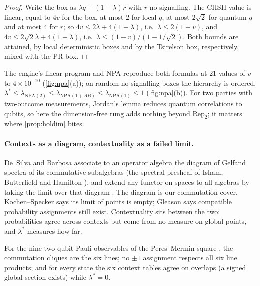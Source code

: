 \documentclass[11pt]{article}
\theoremstyle{definition}\newtheorem{definition}[theorem]{Definition}\newtheorem{remark}[theorem]{Remark}\newtheorem{example}[theorem]{Example}
\begin{document}
\begin{proof}
Write the box as $\lambda q+(1-\lambda)r$ with $r$ no-signalling. The CHSH value is linear, equal to $4v$ for the box, at most $2$ for local $q$,
at most $2\sqrt2$ for quantum $q$ and at most $4$ for $r$; so $4v\le2\lambda+4(1-\lambda)$, i.e.\ $\lambda\le2(1-v)$, and $4v\le2\sqrt2\lambda+
4(1-\lambda)$, i.e.\ $\lambda\le(1-v)/(1-1/\sqrt2)$. Both bounds are attained, by local deterministic boxes and by the Tsirelson box,
respectively, mixed with the PR box.
\end{proof}

The engine's linear program and NPA reproduce both formulas at $21$ values of $v$ to $4\times10^{-10}$ (\cref{fig:npa}(a)); on random
no-signalling boxes the hierarchy is ordered, $\lambda^*\le\lambda_{\mathrm{NPA}(2)}\le\lambda_{\mathrm{NPA}(1+AB)}\le\lambda_{\mathrm{NPA}(1)}\le1$
(\cref{fig:npa}(b)). For two parties with two-outcome measurements, Jordan's lemma reduces quantum correlations to qubits, so here the
dimension-free rung adds nothing beyond $\mathrm{Rep}_2$; it matters where \cref{prop:holdim} bites.

\paragraph{Contexts as a diagram, contextuality as a failed limit.}
De~Silva and Barbosa associate to an operator algebra the diagram of Gelfand spectra of its commutative subalgebras (the spectral presheaf of
Isham, Butterfield and Hamilton \cite{IshamButterfield1998}), and extend any functor on spaces to all algebras by taking the limit over that
diagram \cite{deSilvaBarbosa2019}. The diagram is our commutation cover. Kochen--Specker \cite{KochenSpecker1967} says its limit of points is
empty; Gleason \cite{Gleason1957} says compatible probability assignments still exist. Contextuality sits between the two: probabilities agree
across contexts but come from no measure on global points, and $\lambda^*$ measures how far.

\begin{proposition}\label{prop:pm}
For the nine two-qubit Pauli observables of the Peres--Mermin square \cite{Peres1990,Mermin1990}, the commutation cliques are the six lines; no
$\pm1$ assignment respects all six line products; and for every state the six context tables agree on overlaps (a signed global section exists)
while $\lambda^*=0$.
\end{proposition}
\end{document}
